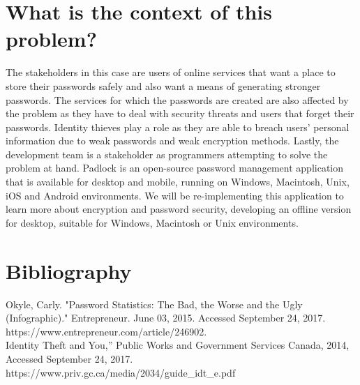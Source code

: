 \documentclass{article}
\begin{document}
\section*{What is the context of this problem?}
The stakeholders in this case are users of online services that want a place to store their passwords safely and also want a means of generating stronger passwords. The services for which the passwords are created are also affected by the problem as they have to deal with security threats and users that forget their passwords. Identity thieves play a role as they are able to breach users’ personal information due to weak passwords and weak encryption methods. Lastly, the development team is a stakeholder as programmers attempting to solve the problem at hand. Padlock is an open-source password management application that is available for desktop and mobile, running on Windows, Macintosh, Unix, iOS and Android environments. We will be re-implementing this application to learn more about encryption and password security, developing an offline version for desktop, suitable for Windows, Macintosh or Unix environments. 

\section*{Bibliography}
Okyle, Carly. "Password Statistics: The Bad, the Worse and the Ugly (Infographic)." Entrepreneur. June 03, 2015. Accessed September 24, 2017. https://www.entrepreneur.com/article/246902.\\
Identity Theft and You,” Public Works and Government Services Canada, 2014, Accessed September 24, 2017. https://www.priv.gc.ca/media/2034/guide\_idt\_e.pdf
\end{document}
